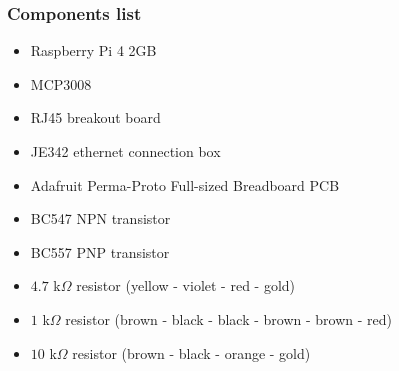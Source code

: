 
\subsubsection{Components list}
	\begin{itemize}
        \item Raspberry Pi 4 2GB
        \item MCP3008
        \item RJ45 breakout board
        \item JE342 ethernet connection box
        \item Adafruit Perma-Proto Full-sized Breadboard PCB
		\item BC547 NPN transistor
		\item BC557 PNP transistor
		\item $4.7$ k$\Omega$ resistor (yellow - violet - red - gold)
		\item $1$ k$\Omega$ resistor (brown - black - black - brown - brown - red)
		\item $10$ k$\Omega$ resistor (brown - black - orange - gold)
	\end{itemize}


